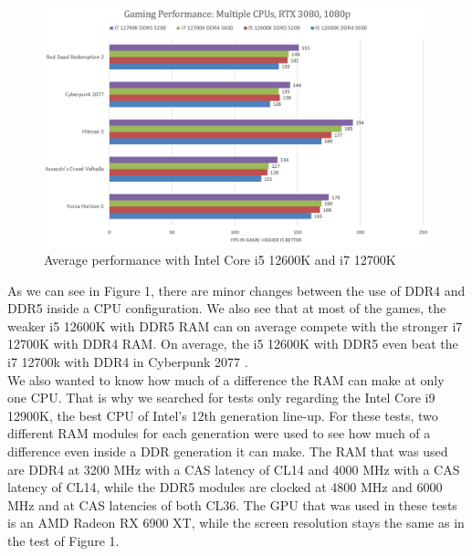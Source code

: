 \begin{figure}[H]
    \centering
    \includegraphics[width=13cm]{figures/Diagram Gaming Performance Multiple CPUs.png}
    \caption{Average performance with Intel Core i5 12600K and i7 12700K \parencite{youtube_test_i7+i5, youtube_test_i5}}
\end{figure}

As we can see in Figure 1, there are minor changes between the use of DDR4 and DDR5 inside a CPU configuration. We also see that at most of the games, the weaker i5 12600K with DDR5 RAM can on average compete with the stronger i7 12700K with DDR4 RAM. On average, the i5 12600K with DDR5 even beat the i7 12700k with DDR4 in Cyberpunk 2077 \parencite{youtube_test_i7+i5, youtube_test_i5}.
\\
We also wanted to know how much of a difference the RAM can make at only one CPU. That is why we searched for tests only regarding the Intel Core i9 12900K, the best CPU of Intel's 12th generation line-up. For these tests, two different RAM modules for each generation were used to see how much of a difference even inside a DDR generation it can make. The RAM that was used are DDR4 at 3200 MHz with a CAS latency of CL14 and 4000 MHz with a CAS latency of CL14, while the DDR5 modules are clocked at 4800 MHz and 6000 MHz and at CAS latencies of both CL36. The GPU that was used in these tests is an AMD Radeon RX 6900 XT, while the screen resolution stays the same as in the test of Figure 1.

